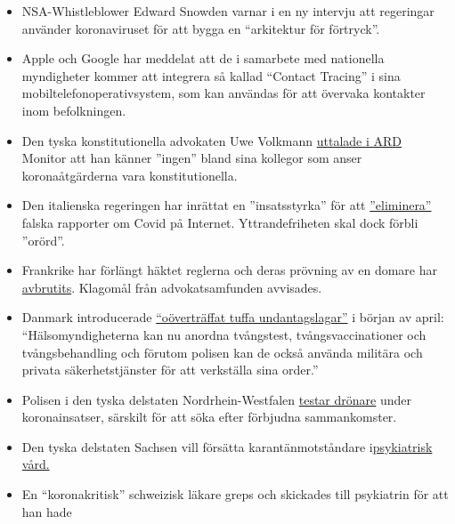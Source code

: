 \begin{itemize}
\tightlist
\item
  NSA-Whistleblower Edward Snowden varnar i en ny intervju att
  regeringar använder koronaviruset för att bygga en ``arkitektur för
  förtryck''.
\item
  Apple och Google har meddelat att de i samarbete med nationella
  myndigheter kommer att integrera så kallad ``Contact Tracing'' i sina
  mobiltelefonoperativsystem, som kan användas för att övervaka
  kontakter inom befolkningen.
\item
  Den tyska konstitutionella advokaten Uwe Volkmann
  \href{https://www.youtube.com/watch?v=DvzrGLvzllU}{uttalade i ARD}
  Monitor att han känner ''ingen'' bland sina kollegor som anser
  koronaåtgärderna vara konstitutionella.
\item
  Den italienska regeringen har inrättat en ''insatsstyrka'' för att
  \href{https://www.faz.net/aktuell/feuilleton/medien/corona-in-italien-das-virus-und-die-wahrheit-16714529.html}{''eliminera''}
  falska rapporter om Covid på Internet. Yttrandefriheten skal dock
  förbli ''orörd''.
\item
  Frankrike har förlängt häktet reglerna och deras prövning av en domare
  har
  \href{https://www.lefigaro.fr/politique/coronavirus-le-conseil-d-etat-sur-la-ligne-de-crete-des-libertes-publiques-20200406}{avbrutits}.
  Klagomål från advokatsamfunden avvisades.
\item
  Danmark introducerade
  \href{https://www.fr.de/politik/coronavirus-sars-cov-2-daenemark-notfalls-militaer-13598503.html}{``oöverträffat
  tuffa undantagslagar''} i början av april: ``Hälsomyndigheterna kan nu
  anordna tvångstest, tvångsvaccinationer och tvångsbehandling och
  förutom polisen kan de också använda militära och privata
  säkerhetstjänster för att verkställa sina order.''
\item
  Polisen i den tyska delstaten Nordrhein-Westfalen
  \href{https://rp-online.de/nrw/panorama/nrw-polizei-testet-drohnen-bei-einsaetzen-wegen-corona-massnahmen_aid-50006143}{testar
  drönare} under koronainsatser, särskilt för att söka efter förbjudna
  sammankomster.
\item
  Den tyska delstaten Sachsen vill försätta karantänmotståndare
  i\href{https://www.welt.de/politik/deutschland/article207198029/Coronavirus-Sachsen-will-Quarantaene-Verweigerer-in-Psychiatrien-sperren.html}{psykiatrisk
  vård.}
\item
  En ``koronakritisk'' schweizisk läkare greps och skickades till
  psykiatrin för att han hade

\end{itemize}
